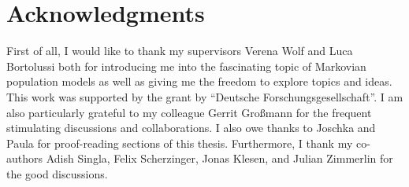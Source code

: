 



\vspace{3cm}

\begingroup
\let\clearpage\relax
\let\cleardoublepage\relax
\let\cleardoublepage\relax
\chapter*{Acknowledgments}
First of all, I would like to thank my supervisors Verena Wolf and Luca Bortolussi both for introducing me into the fascinating topic of Markovian population models as well as giving me the freedom to explore topics and ideas.
This work was supported by the  grant by ``Deutsche Forschungsgesellschaft''.
I am also particularly grateful to my colleague Gerrit Großmann for the frequent stimulating discussions and collaborations.
I also owe thanks to Joschka and Paula for proof-reading sections of this thesis.
Furthermore, I thank my co-authors Adish Singla, Felix Scherzinger, Jonas Klesen, and Julian Zimmerlin for the good discussions.



\endgroup
